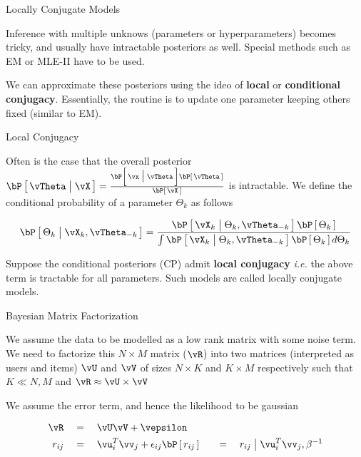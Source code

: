 \documentclass{article}
\begin{document}
\makeheader%

\begin{ssection}{Locally Conjugate Models}

	Inference with multiple unknows (parameters or hyperparameters) becomes tricky, and usually have intractable posteriors as well. Special methods such as EM or MLE-II have to be used. \br%

	We can approximate these posteriors using the ideo of \textbf{local} or \textbf{conditional conjugacy}. Essentially, the routine is to update one parameter keeping others fixed (similar to EM).

	\begin{ssubsection}{Local Conjugacy}

		Often is the case that the overall posterior $\prob{\vTheta \pipe \vX} = \frac{\prob{\vx \pipe \vTheta} \prob{\vTheta}}{\prob{\vX}}$ is intractable. We define the conditional probability of a parameter $\Theta_k$ as follows

		\begin{align*}
			\prob{\Theta_k \pipe \vX_k, \vTheta_{-k}} = \frac{\prob{\vX_k \pipe \Theta_k, \vTheta_{-k}} \prob{\Theta_k}}{\int \prob{\vX_k \pipe \Theta_k, \vTheta_{-k}} \prob{\Theta_k} d\Theta_k}
		\end{align*} \br%

		 \br%

		Suppose the conditional posteriors (CP) admit \textbf{local conjugacy} \textit{i.e.} the above term is tractable for all parameters. Such models are called locally conjugate models.

	\end{ssubsection}

	\begin{ssubsection}{Bayesian Matrix Factorization}

		We assume the data to be modelled as a low rank matrix with some noise term. We need to factorize this $N \times M$ matrix ($\vR$) into two matrices (interpreted as users and items) $\vU$ and $\vV$ of sizes $N \times K$ and $K \times M$ respectively such that $K \ll N, M$ and $\vR \approx \vU \times \vV$ \br%

		We assume the error term, and hence the likelihood to be gaussian

		\begin{align*}
			\vR				&\eq \vU \vV + \vepsilon \\
			r_{ij}			&\eq \vu_i^T \vv_j + \eps_{ij}
			\prob{r_{ij}}	&\eq {r_{ij} \pipe \vu_i^T \vv_j , \beta^{-1}}
		\end{align*} \br


\end{ssubsection}
\end{ssection}
\end{document}
